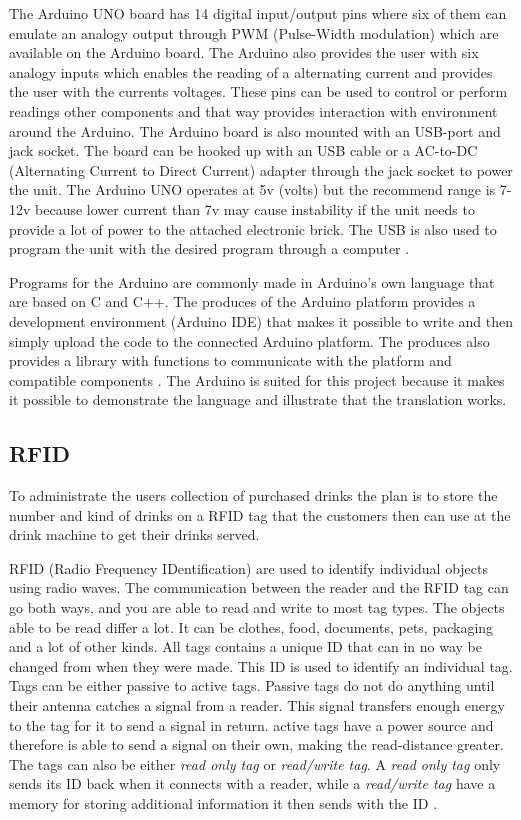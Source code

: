The Arduino UNO board has 14 digital input/output pins where six of them can emulate an analogy output through PWM (Pulse-Width modulation) which are available on the Arduino board. The Arduino also provides the user with six analogy inputs which enables the reading of a alternating current and provides the user with the currents voltages. These pins can be used to control or perform readings other components and that way provides interaction with environment around the Arduino.
The Arduino board is also mounted with an USB-port and jack socket. The board can be hooked up with an USB cable or a AC-to-DC (Alternating Current to Direct Current) adapter through the jack socket to power the unit. The Arduino UNO operates at 5v (volts) but the recommend range is 7-12v because lower current than 7v may cause instability if the unit needs to provide a lot of power to the attached electronic brick. The USB is also used to program the unit with the desired program through a computer \citep{ArduinoUno}.

Programs for the Arduino are commonly made in Arduino's own language that are based on C and C++. The produces of the Arduino platform provides a development environment (Arduino IDE) that makes it possible to write and then simply upload the code to the connected Arduino platform. The produces also provides a library with functions to communicate with the platform and compatible components \citep{ArduinoLanguage}.
The Arduino is suited for this project because it makes it possible to demonstrate the language and illustrate that the translation works. 

\subsection{RFID}
To administrate the users collection of purchased drinks the plan is to store the number and kind of drinks on a RFID tag that the customers then can use at the drink machine to get their drinks served.

RFID (Radio Frequency IDentification) are used to identify individual objects using radio waves.
The communication between the reader and the RFID tag can go both ways, and you are able to read and write to most tag types. 
The objects able to be read differ a lot. It can be clothes, food, documents, pets, packaging and a lot of other kinds. 
All tags contains a unique ID that can in no way be changed from when they were made. This ID is used to identify an individual tag.
Tags can be either passive to active tags. Passive tags do not do anything until their antenna catches a signal from a reader. This signal transfers enough energy to the tag for it to send a signal in return. active tags have a power source and therefore is able to send a signal on their own, making the read-distance greater.
The tags can also be either \textit{read only tag} or \textit{read/write tag}. A \textit{read only tag} only sends its ID back when it connects with a reader, while a \textit{read/write tag} have a memory for storing additional information it then sends with the ID \citep{RFID}.

